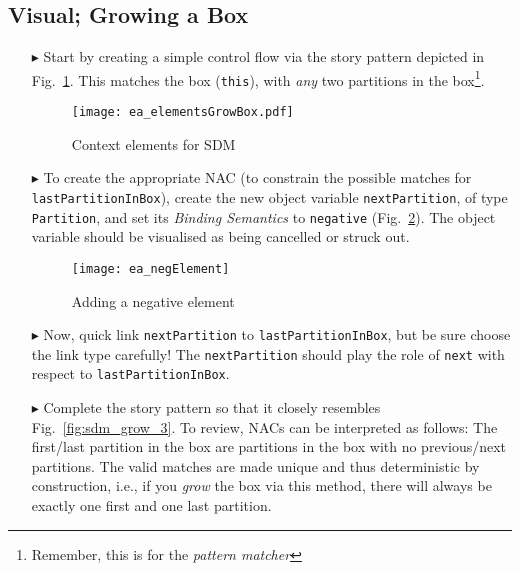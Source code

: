 \newpage
\subsection{Visual; Growing a Box}
\visHeader
\hypertarget{growBox vis}{}

\begin{itemize}
 
\item[$\blacktriangleright$] Start by creating a simple control flow via the story pattern depicted in Fig.~\ref{fig:sdm_grow_1}. This matches the box
(\texttt{this}), with \emph{any} two partitions in the box\footnote{Remember, this is for the \emph{pattern matcher}}.

\begin{figure}[htbp]
\begin{center}
  \texttt{[image: ea\_elementsGrowBox.pdf]}
  \caption{Context elements for SDM}  
  \label{fig:sdm_grow_1}
\end{center}
\end{figure}

\item[$\blacktriangleright$] To create the appropriate \mbox{NAC} (to constrain the possible matches for \texttt{lastPartitionInBox}),  create the new object
variable \texttt{nextPartition}, of type \texttt{Partition}, and set  its \emph{Binding Semantics} to \texttt{negative}
(Fig.~\ref{fig:sdm_grow_2}). The object variable should be visualised as being cancelled or struck out. %
 
\begin{figure}[htbp]
\begin{center}
  \texttt{[image: ea\_negElement]}
  \caption{Adding a negative element}  
  \label{fig:sdm_grow_2}
\end{center}
\end{figure}
 
\item[$\blacktriangleright$] Now, quick link \texttt{nextPartition} to \texttt{lastPartitionInBox}, but be sure choose the link type carefully! The
\texttt{nextPartition} should play the role of \texttt{next} with respect to \texttt{lastPartitionInBox}.

\item[$\blacktriangleright$] Complete the story pattern so that it closely resembles Fig.~\ref{fig:sdm_grow_3}. To review, \mbox{NACs} can be interpreted as
follows:  The first/last partition in the box are partitions in the box with no previous/next partitions. The valid matches are made unique and thus
deterministic by construction, i.e., if you \emph{grow} the box via this method, there will always be exactly one first and one last partition.


\end{itemize}
